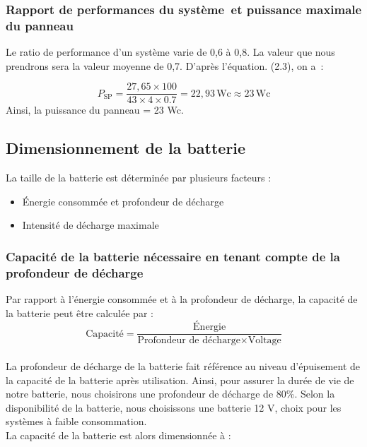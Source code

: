 \subsubsection{Rapport de performances du système et puissance maximale du panneau}
Le ratio de performance d'un système varie de 0,6 à 0,8. La valeur que nous prendrons sera la valeur moyenne de 0,7.
D’après l’équation. (2.3), on a :

\begin{equation}
P_{\text{SP}} = \frac{27,65 \times 100}{43 \times 4 \times 0.7} = 22,93 \, \text{Wc} \approx 23 \, \text{Wc}
\end{equation}
Ainsi, la puissance du panneau = 23 Wc.

\subsection{Dimensionnement de la batterie}
La taille de la batterie est déterminée par plusieurs facteurs :

\begin{itemize}
	\item Énergie consommée et profondeur de décharge
	\item	Intensité de décharge maximale
\end{itemize}

\subsubsection{Capacité de la batterie nécessaire en tenant compte de la profondeur de décharge}	
Par rapport à l'énergie consommée et à la profondeur de décharge, la capacité de la batterie peut être calculée par :
\\


\begin{equation}
\text{Capacité} = \frac{\text{Énergie}}{\text{Profondeur de décharge} \times \text{Voltage}} \tag{2.6}
\end{equation}  
\\

La profondeur de décharge de la batterie fait référence au niveau d’épuisement de la capacité de la batterie après utilisation. Ainsi, pour assurer la durée de vie de notre batterie, nous choisirons une profondeur de décharge de 80\%.
Selon la disponibilité de la batterie, nous choisissons une batterie 12 V, choix pour les systèmes à faible consommation.
\\
La capacité de la batterie est alors dimensionnée à :

